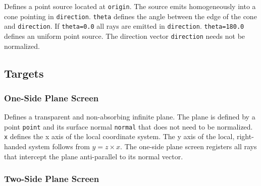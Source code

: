 \documentclass[10pt,a4paper,titlepage]{article}
\begin{document}






Defines a point source located at {\tt origin}. The source emits homogeneously into a cone pointing in {\tt direction}. {\tt theta} defines the angle between the edge of the cone and {\tt direction}. If {\tt theta=0.0} all rays are emitted in {\tt direction}. {\tt theta=180.0} defines an uniform point source. The direction vector {\tt direction} needs not be normalized.


\subsection{Targets}

\subsubsection{One-Side Plane Screen}






Defines a transparent and non-absorbing infinite plane. The plane is defined by a point {\tt point} and its surface normal {\tt normal} that does not need to be normalized. {\tt x} defines the x axis of the local coordinate system. The y axis of the local, right-handed system follows from $y=z \times x$. The one-side plane screen registers all rays that intercept the plane anti-parallel to its normal vector.


\subsubsection{Two-Side Plane Screen}



\end{document}
